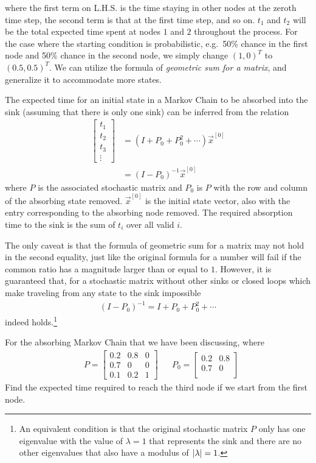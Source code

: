 where the first term on L.H.S. is the time staying in other nodes at the zeroth time step, the second term is that at the first time step, and so on. $t_1$ and $t_2$ will be the total expected time spent at nodes $1$ and $2$ throughout the process. For the case where the starting condition is probabilistic, e.g.\ 50\% chance in the first node
and 50\% chance in the second node, we simply change $(1,0)^T$ to $(0.5,0.5)^T$. We can utilize the formula of \textit{geometric sum for a matrix}, and generalize it to accommodate more states.
\begin{proper}
The expected time for an initial state in a Markov Chain to be absorbed into the sink (assuming that there is only one sink) can be inferred from the relation
\begin{subequations}
\begin{align}
\begin{bmatrix}
t_1 \\
t_2 \\
t_3 \\
\vdots 
\end{bmatrix}
&= (I + P_0 + P_0^2 + \cdots)\vec{x}^{[0]} \\
&= (I - P_0)^{-1}
\vec{x}^{[0]}
\end{align}    
\end{subequations}
where $P$ is the associated stochastic matrix and $P_0$ is $P$ with the row and column of the absorbing state removed. $\vec{x}^{[0]}$ is the initial state vector, also with the entry corresponding to the absorbing node removed. The required absorption time to the sink is the sum of $t_i$ over all valid $i$. 
\end{proper}
The only caveat is that the formula of geometric sum for a matrix may not hold in the second equality, just like the original formula for a number will fail if the common ratio has a magnitude larger than or equal to $1$. However, it is guaranteed that, for a stochastic matrix without other sinks or closed loops which make traveling from any state to the sink impossible
\begin{align}
(I - P_0)^{-1} = I + P_0 + P_0^2 + \cdots    
\end{align}
indeed holds.\footnote{An equivalent condition is that the original stochastic matrix $P$ only has one eigenvalue with the value of $\lambda = 1$ that represents the sink and there are no other eigenvalues that also have a modulus of $\abs{\lambda} = 1$.}
\begin{exmp}
For the absorbing Markov Chain that we have been discussing, where
\begin{align*}
& P = 
\begin{bmatrix}
0.2 & 0.8 & 0 \\
0.7 & 0 & 0 \\
0.1 & 0.2 & 1
\end{bmatrix}
&
& P_0 = 
\begin{bmatrix}
0.2 & 0.8\\
0.7 & 0 \\
\end{bmatrix}   
\end{align*}
Find the expected time required to reach the third node if we start from the first node.
\end{exmp}
